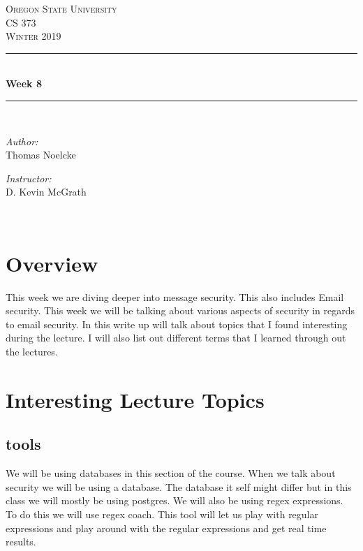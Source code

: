 \documentclass[letterpaper, onecolumn,10pt]{IEEEtran}
\begin{document}
    \begin{titlepage}
    \newcommand{\HRule}{\rule{\linewidth}{0.5mm}}
    \center
    \textsc{\Large Oregon State University}\\[1.5cm]
    \textsc{\Large CS 373}\\[0.5cm]
    \textsc{\Large Winter 2019}\\[0.5cm]
    \HRule \\[0.4cm]
    { \huge \bfseries Week 8}\\[0.4cm] %
    \HRule \\[1.5cm]
    \begin{minipage}{0.4\textwidth}
        \begin{flushleft} \large
        \emph{Author:}\\
        Thomas Noelcke
        \end{flushleft}
    \end{minipage}
    \begin{minipage}{0.4\textwidth}
        \begin{flushright} \large
        \emph{Instructor:} \\
        D. Kevin McGrath\\
        \end{flushright}
    \end{minipage}\\[2cm]
		\end{titlepage}
		
		
		\section{Overview}
		    This week we are diving deeper into message security. This also includes Email security. This week we will be talking about various aspects of security in regards to email security. In this write up will talk about topics that I found interesting during the lecture. I will also list out different terms that I learned through out the lectures.\\
		    
			
		\section{Interesting Lecture Topics}
		    \subsection{tools}
		    We will be using databases in this section of the course. When we talk about security we will be using a database. The database it self might differ but in this class we will mostly be using postgres. We will also be using regex expressions. To do this we will use regex coach. This tool will let us play with regular expressions and play around with the regular expressions and get real time results.\\
		    
\end{document}
